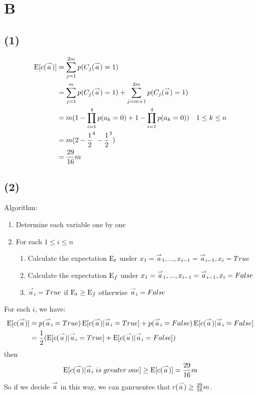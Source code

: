 \documentclass{article}
\newcommand{\A}{\overset{\large \rightharpoonup}{\small{a}}}
\begin{document}
\section*{B}

\subsection*{(1)}
\begin{equation*}
\begin{aligned}
  \E[c(\A)] & = \sum_{j=1}^{2m}p(C_j(\A) = 1) \\
            & = \sum_{j=1}^{m}p(C_j(\A) = 1) + \sum_{j=m+1}^{2m}p(C_j(\A) = 1) \\
            & = m(1-\prod_{i=1}^{4}p(a_k=0) + 1-\prod_{i=1}^{4}p(a_k=0)) \quad 1 \leq k \leq n \\
            & = m(2- \frac{1}{2}^4 - \frac{1}{2}^3) \\
            & = \frac{29}{16}m
\end{aligned}
\end{equation*}

\subsection*{(2)}
Algorithm:
\begin{enumerate}
  \item Determine each variable one by one
  \item For each $1 \leq i \leq n$
    \begin{enumerate}
      \item Calculate the expectation $\operatorname{E}_t$ under $x_1 = \A_1, ..., x_{i-1} = \A_{i-1}, x_i = True$
      \item Calculate the expectation $\operatorname{E}_f$ under $x_1 = \A_1, ..., x_{i-1} = \A_{i-1}, x_i = False$
      \item $\A_i = True$ if $\operatorname{E}_t \geq \operatorname{E}_f$ otherwise $\A_i = False$
    \end{enumerate}
\end{enumerate}

For each $i$, we have:
\begin{equation*}
\begin{aligned}
  \E[c(\A)] & = p(\A_i=True)\E[c(\A)|\A_i=True] + p(\A_i=False)\E[c(\A)|\A_i=False] \\
            & = \frac{1}{2}(\E[c(\A)|\A_i=True]+\E[c(\A)|\A_i=False])
\end{aligned}
\end{equation*}
then
\begin{equation*}
\begin{aligned}
  \E[c(\A)|\A_i\;is\;greater\;one] \geq \E[c(\A)] = \frac{29}{16}m
\end{aligned}
\end{equation*}
So if we decide $\A$ in this way, we can ganruentee that $c(\A) \geq \frac{29}{16}m$.
\end{document}
